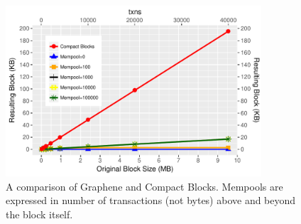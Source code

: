 \begin{figure}\begin{center}
	\includegraphics[width=0.85\textwidth]{graphs/graphene}
	\caption{A comparison of Graphene and Compact Blocks.
Mempools are expressed in number of transactions (not
bytes) above and beyond the block itself.
	\label{fig:graphene}}
\end{center}\end{figure}

